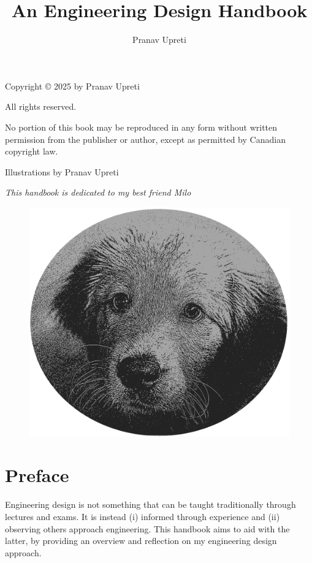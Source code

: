 \documentclass{antiquebook}
\author{Pranav Upreti}
\title{An Engineering Design Handbook}
\date{}
\begin{document}
	\frontmatter
	\maketitle
		\hspace{0pt}
		\vfill
		\begin{center}
			Copyright © 2025 by Pranav Upreti

			All rights reserved.

			No portion of this book may be reproduced in any form without written permission from the publisher or author, except as permitted by Canadian copyright law.

			Illustrations by Pranav Upreti 
		\end{center}
		\newpage
		\hspace{0pt}
		\vfill
		\begin{center}
			\textit{This handbook is dedicated to my best friend Milo}
			\begin{figure}[H]
				\centering
				\includegraphics[scale=0.5]{MiloOfficial.png}
			\end{figure}
		\end{center}
		\vfill
	\chapter*{Preface}
	Engineering design is not something that can be taught traditionally through lectures and exams. It is instead (i) informed through experience and (ii) observing others approach engineering. This handbook aims to aid with the latter, by providing an overview and reflection on my engineering design approach. 
\end{document}
